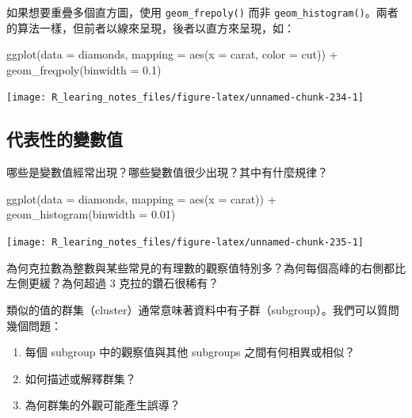 \documentclass[
]{book}
\newenvironment{Shaded}{\begin{snugshade}}{\end{snugshade}}
\newcommand{\AttributeTok}[1]{\textcolor[rgb]{0.77,0.63,0.00}{#1}}
\newcommand{\FloatTok}[1]{\textcolor[rgb]{0.00,0.00,0.81}{#1}}
\newcommand{\FunctionTok}[1]{\textcolor[rgb]{0.00,0.00,0.00}{#1}}
\newcommand{\NormalTok}[1]{#1}
\newcommand{\SpecialCharTok}[1]{\textcolor[rgb]{0.00,0.00,0.00}{#1}}
\theoremstyle{definition}
\theoremstyle{remark}
\begin{document}
如果想要重疊多個直方圖，使用 \texttt{geom\_frepoly()} 而非 \texttt{geom\_histogram()}。兩者的算法一樣，但前者以線來呈現，後者以直方來呈現，如：

\begin{Shaded}
\begin{Highlighting}[]
\FunctionTok{ggplot}\NormalTok{(}\AttributeTok{data =}\NormalTok{ diamonds, }\AttributeTok{mapping =} \FunctionTok{aes}\NormalTok{(}\AttributeTok{x =}\NormalTok{ carat, }\AttributeTok{color =}\NormalTok{ cut)) }\SpecialCharTok{+}
  \FunctionTok{geom\_freqpoly}\NormalTok{(}\AttributeTok{binwidth =} \FloatTok{0.1}\NormalTok{)}
\end{Highlighting}
\end{Shaded}

\begin{center}\texttt{[image: R\_learing\_notes\_files/figure-latex/unnamed-chunk-234-1]} \end{center}

\hypertarget{ux4ee3ux8868ux6027ux7684ux8b8aux6578ux503c}{%
\subsection{代表性的變數值}\label{ux4ee3ux8868ux6027ux7684ux8b8aux6578ux503c}}

哪些是變數值經常出現？哪些變數值很少出現？其中有什麼規律？

\begin{Shaded}
\begin{Highlighting}[]
\FunctionTok{ggplot}\NormalTok{(}\AttributeTok{data =}\NormalTok{ diamonds, }\AttributeTok{mapping =} \FunctionTok{aes}\NormalTok{(}\AttributeTok{x =}\NormalTok{ carat)) }\SpecialCharTok{+}
  \FunctionTok{geom\_histogram}\NormalTok{(}\AttributeTok{binwidth =} \FloatTok{0.01}\NormalTok{)}
\end{Highlighting}
\end{Shaded}

\begin{center}\texttt{[image: R\_learing\_notes\_files/figure-latex/unnamed-chunk-235-1]} \end{center}

為何克拉數為整數與某些常見的有理數的觀察值特別多？為何每個高峰的右側都比左側更緩？為何超過 3 克拉的鑽石很稀有？

類似的值的群集（cluster）通常意味著資料中有子群（subgroup）。我們可以質問幾個問題：

\begin{enumerate}
\def\labelenumi{\arabic{enumi}.}
\item
  每個 subgroup 中的觀察值與其他 subgroups 之間有何相異或相似？
\item
  如何描述或解釋群集？
\item
  為何群集的外觀可能產生誤導？
\end{enumerate}
\end{document}

